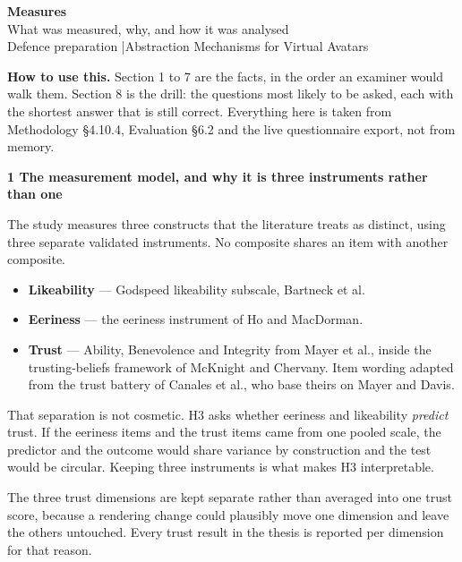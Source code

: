 \documentclass[10pt,a4paper]{article}
\newcommand{\sect}[1]{%
  \needspace{4\baselineskip}\vspace{0.7em}
  \noindent\colorbox{knblue}{\parbox{0.978\textwidth}{\vspace{1pt}\color{white}\textbf{#1}\vspace{1pt}}}
  \vspace{0.3em}\par}
\newcommand{\key}[1]{{\color{knblue}\textbf{#1}}}
\begin{document}
\begin{center}
  {\LARGE\bfseries\color{knblue} Measures}\\[0.3em]
  {\large What was measured, why, and how it was analysed}\\[0.25em]
  {\color{kngrey} Defence preparation \quad|\quad Abstraction Mechanisms for Virtual Avatars}
\end{center}

\vspace{0.4em}

\noindent\colorbox{knlight}{\parbox{0.972\textwidth}{\small\color{knblue}
\textbf{How to use this.} Section 1 to 7 are the facts, in the order an examiner would walk them. Section 8 is the drill: the questions most likely to be asked, each with the shortest answer that is still correct. Everything here is taken from Methodology §4.10.4, Evaluation §6.2 and the live questionnaire export, not from memory.}}

\sect{1 \quad The measurement model, and why it is three instruments rather than one}

The study measures three constructs that the literature treats as distinct, using three separate validated instruments. No composite shares an item with another composite.

\begin{itemize}[leftmargin=1.2em,itemsep=0.15em]
  \item \key{Likeability} — Godspeed likeability subscale, Bartneck et al.
  \item \key{Eeriness} — the eeriness instrument of Ho and MacDorman.
  \item \key{Trust} — Ability, Benevolence and Integrity from Mayer et al., inside the trusting-beliefs framework of McKnight and Chervany. Item wording adapted from the trust battery of Canales et al., who base theirs on Mayer and Davis.
\end{itemize}

That separation is not cosmetic. H3 asks whether eeriness and likeability \emph{predict} trust. If the eeriness items and the trust items came from one pooled scale, the predictor and the outcome would share variance by construction and the test would be circular. Keeping three instruments is what makes H3 interpretable.

The three trust dimensions are kept separate rather than averaged into one trust score, because a rendering change could plausibly move one dimension and leave the others untouched. Every trust result in the thesis is reported per dimension for that reason.
\end{document}
